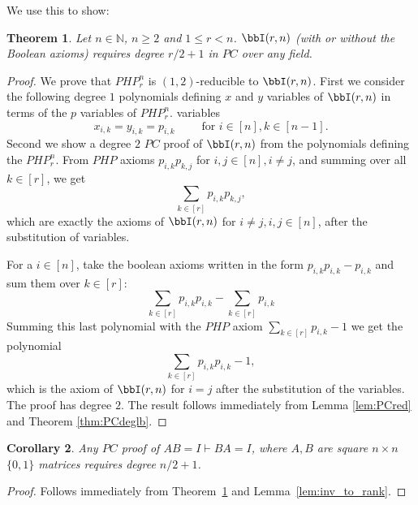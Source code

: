 \documentclass[10pt,a4paper]{article}
\newtheorem{theorem}{Theorem}[section]
\newtheorem{corollary}[theorem]{Corollary}
\theoremstyle{definition}
\begin{document}
We use this to show:

\begin{theorem} \label{thm:rank}
Let $n\in \mathbb N$,  $n\geq 2$ and $1\leq r<n$. $\bbI(r,n)$ (with or without the Boolean axioms) requires degree $r/2+1$ in $PC$ over any field.
\end{theorem}
\begin{proof}
We prove that $PHP^n_{r}$ is $(1,2)$-reducible to $\bbI(r,n)$. 
First we consider the following degree $1$  polynomials  defining $x$ and $y$ variables of $\bbI(r,n)$ 
in terms of the $p$ variables of $PHP^n_{r}$.
variables 
$$
x_{i,k} = y_{i,k} = p_{i,k} \qquad \mbox{ for } i \in [n], k \in [n-1].
$$ 
Second we show a degree $2$ $PC$ proof   of $\bbI(r,n)$ from the  polynomials defining the  $PHP^n_r$.
From $PHP$ axioms $p_{i,k}p_{k,j}$ for $i,j \in [n], i\not =j$,  and summing over all $k \in [r]$, we get 
$$
\sum_{k \in [r]}p_{i,k}p_{k,j},
$$ 
which are exactly the axioms of $\bbI(r,n)$ for $i \not =j, i,j \in [n]$, after the substitution of variables.

For a $i\in [n]$, take  the boolean axioms written in the form $p_{i,k}p_{i,k}-p_{i,k}$ and  sum them over $k \in [r]$:
$$\sum_{k \in [r]} p_{i,k}p_{i,k} - \sum_{k \in [r]}p_{i,k}$$
Summing this last polynomial with the $PHP$ axiom $\sum_{k \in [r]} p_{i,k} -1$
we get the polynomial
$$\sum_{k\in [r]}p_{i,k}p_{i,k} -1,$$
which is the axiom of $\bbI(r,n)$ for $i=j$ after the substitution of the  variables.  The proof has degree $2$. 
The result follows immediately  from Lemma \ref{lem:PCred} and Theorem \ref{thm:PCdeglb}. 

\end{proof}

\begin{corollary}
Any $PC$ proof of $AB=I \vdash BA=I$, where $A,B$ are square $n\times n$ $\{0,1\}$ matrices requires degree $n/2+1$.
\end{corollary}

\begin{proof}
Follows immediately from Theorem~\ref{thm:rank} and Lemma~\ref{lem:inv_to_rank}.
\end{proof}
\end{document}
